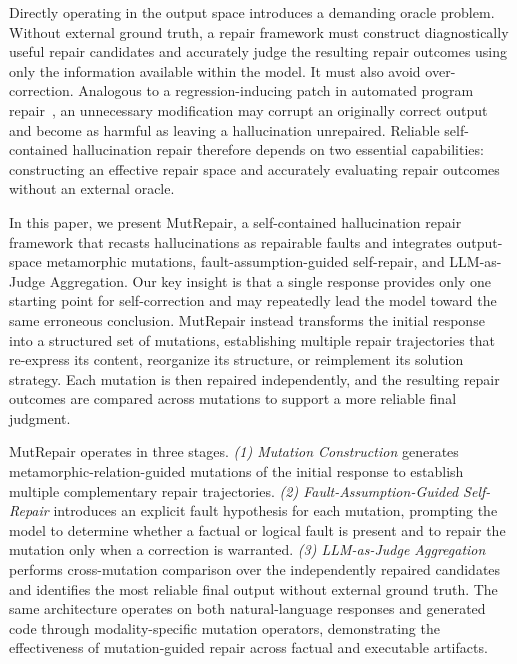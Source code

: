 \documentclass[acmsmall,screen,review,anonymous]{acmart}
\begin{document}
Directly operating in the output space introduces a demanding oracle problem. Without external ground truth, a repair framework must construct diagnostically useful repair candidates and accurately judge the resulting repair outcomes using only the information available within the model. It must also avoid over-correction. Analogous to a regression-inducing patch in automated program repair~\cite{petke2024patch}, an unnecessary modification may corrupt an originally correct output and become as harmful as leaving a hallucination unrepaired. Reliable self-contained hallucination repair therefore depends on two essential capabilities: constructing an effective repair space and accurately evaluating repair outcomes without an external oracle.

In this paper, we present MutRepair, a self-contained hallucination repair framework that recasts hallucinations as repairable faults and integrates output-space metamorphic mutations, fault-assumption-guided self-repair, and LLM-as-Judge Aggregation. Our key insight is that a single response provides only one starting point for self-correction and may repeatedly lead the model toward the same erroneous conclusion. MutRepair instead transforms the initial response into a structured set of mutations, establishing multiple repair trajectories that re-express its content, reorganize its structure, or reimplement its solution strategy. Each mutation is then repaired independently, and the resulting repair outcomes are compared across mutations to support a more reliable final judgment.

MutRepair operates in three stages. \emph{(1) Mutation Construction} generates metamorphic-relation-guided mutations of the initial response to establish multiple complementary repair trajectories. \emph{(2) Fault-Assumption-Guided Self-Repair} introduces an explicit fault hypothesis for each mutation, prompting the model to determine whether a factual or logical fault is present and to repair the mutation only when a correction is warranted. \emph{(3) LLM-as-Judge Aggregation} performs cross-mutation comparison over the independently repaired candidates and identifies the most reliable final output without external ground truth. The same architecture operates on both natural-language responses and generated code through modality-specific mutation operators, demonstrating the effectiveness of mutation-guided repair across factual and executable artifacts.
\end{document}
